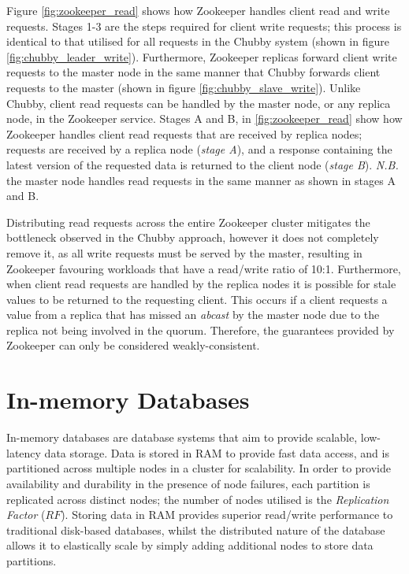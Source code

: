     Figure \ref{fig:zookeeper_read} shows how Zookeeper handles client read and write requests.  Stages 1-3 are the steps required for client write requests; this process is identical to that utilised for all requests in the Chubby system (shown in figure \ref{fig:chubby_leader_write}).  Furthermore, Zookeeper replicas forward client write requests to the master node in the same manner that Chubby forwards client requests to the master (shown in figure \ref{fig:chubby_slave_write}).  Unlike Chubby, client read requests can be handled by the master node, or any replica node, in the Zookeeper service.  Stages A and B, in \ref{fig:zookeeper_read} show how Zookeeper handles client read requests that are received by replica nodes; requests are received by a replica node (\emph{stage A}), and a response containing the latest version of the requested data is returned to the client node (\emph{stage B}).  \emph{N.B.} the master node handles read requests in the same manner as shown in stages A and B.  
    
	
	Distributing read requests across the entire Zookeeper cluster mitigates the bottleneck observed in the Chubby approach, however it does not completely remove it, as all write requests must be served by the master, resulting in Zookeeper favouring workloads that have a read/write ratio of 10:1. Furthermore, when client read requests are handled by the replica nodes it is possible for stale values to be returned to the requesting client.  This occurs if a client requests a value from a replica that has missed an \emph{abcast} by the master node due to the replica not being involved in the quorum.  Therefore, the guarantees provided by Zookeeper can only be considered weakly-consistent.   


\section{In-memory Databases}
In-memory databases\citep{Infinispan, Hazelcast, GridGain, OracleCoherence, PivotalGemFire} are database systems that aim to provide scalable, low-latency data storage.  Data is stored in RAM to provide fast data access, and is partitioned across multiple nodes in a cluster for scalability.  In order to provide availability and durability in the presence of node failures, each partition is replicated across distinct nodes; the number of nodes utilised is the \emph{Replication Factor} ($RF$).  Storing data in RAM provides superior read/write performance to traditional disk-based databases, whilst the distributed nature of the database allows it to elastically scale by simply adding additional nodes to store data partitions.  

